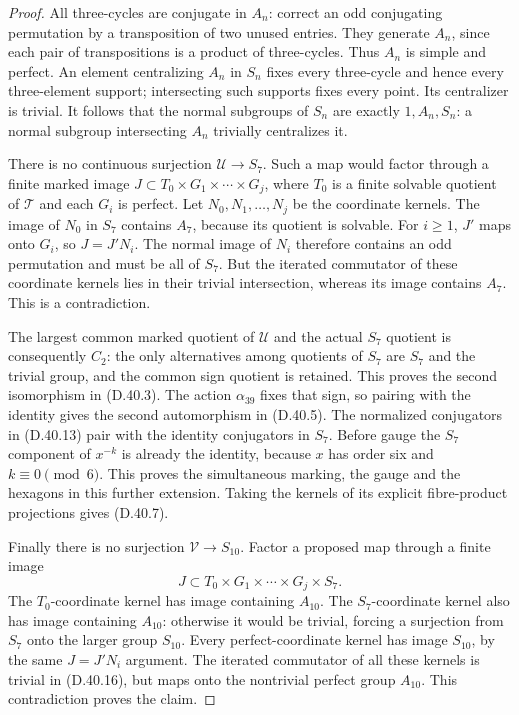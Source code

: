 \begin{proof}
All three-cycles are conjugate in $A_n$: correct
an odd conjugating permutation by a transposition
of two unused entries. They generate $A_n$, since
each pair of transpositions is a product of
three-cycles. Thus $A_n$ is simple and perfect.
An element centralizing $A_n$ in $S_n$ fixes every
three-cycle and hence every three-element support;
intersecting such supports fixes every point.
Its centralizer is trivial. It follows that the
normal subgroups of $S_n$ are exactly
$1,A_n,S_n$: a normal subgroup intersecting
$A_n$ trivially centralizes it.

There is no continuous surjection $\mathcal U\to S_7$.
Such a map would factor through a finite marked
image
$J\subset T_0\times G_1\times\cdots\times G_j$,
where $T_0$ is a finite solvable quotient of
$\mathcal T$ and each $G_i$ is perfect. Let
$N_0,N_1,\ldots,N_j$ be the coordinate kernels.
The image of $N_0$ in $S_7$ contains $A_7$,
because its quotient is solvable. For $i\ge1$,
$J'$ maps onto $G_i$, so $J=J'N_i$.
The normal image of $N_i$ therefore contains
an odd permutation and must be all of $S_7$.
But the iterated commutator of these coordinate
kernels lies in their trivial intersection,
whereas its image contains $A_7$. This is a
contradiction.

The largest common marked quotient of $\mathcal U$
and the actual $S_7$ quotient is consequently
$C_2$: the only alternatives among quotients
of $S_7$ are $S_7$ and the trivial group, and
the common sign quotient is retained. This
proves the second isomorphism in (D.40.3).
The action $\alpha_{39}$ fixes that sign, so
pairing with the identity gives the second
automorphism in (D.40.5). The normalized
conjugators in (D.40.13) pair with the identity
conjugators in $S_7$. Before gauge the $S_7$
component of $x^{-k}$ is already the identity,
because $x$ has order six and $k\equiv0\pmod6$.
This proves the simultaneous marking, the
gauge and the hexagons in this further extension.
Taking the kernels of its explicit fibre-product
projections gives (D.40.7).

Finally there is no surjection $\mathcal V\to S_{10}$.
Factor a proposed map through a finite image
\[
 J\subset T_0\times G_1\times\cdots\times G_j\times S_7.
                                                               \tag{D.40.16}
\]
The $T_0$-coordinate kernel has image containing
$A_{10}$. The $S_7$-coordinate kernel also has
image containing $A_{10}$: otherwise it would
be trivial, forcing a surjection from $S_7$
onto the larger group $S_{10}$.
Every perfect-coordinate kernel has image
$S_{10}$, by the same $J=J'N_i$ argument.
The iterated commutator of all these kernels
is trivial in (D.40.16), but maps onto the
nontrivial perfect group $A_{10}$. This
contradiction proves the claim.


\end{proof}
